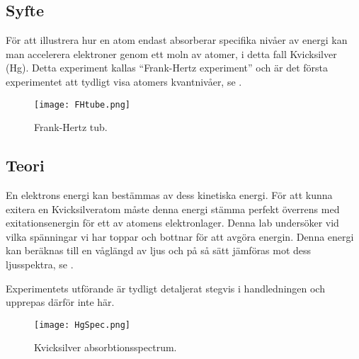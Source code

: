 \subsection*{Syfte}
För att illustrera hur en atom endast absorberar specifika nivåer av energi kan man accelerera elektroner genom ett moln av atomer, i detta fall Kvicksilver (Hg). 
Detta experiment kallas ``Frank-Hertz experiment'' och är det första experimentet att tydligt visa atomers kvantnivåer, se .
\begin{figure}[hb]
	\centering
	\texttt{[image: FHtube.png]}
	\caption{Frank-Hertz tub.\cite{handledning}}
	\label{fig:tubesch}
\end{figure}

\subsection*{Teori}
En elektrons energi kan bestämmas av dess kinetiska energi. För att kunna exitera en Kvicksilveratom måste denna energi stämma perfekt överrens med exitationsenergin för ett av atomens elektronlager.
Denna lab undersöker vid vilka spänningar vi har toppar och bottnar för att avgöra energin. Denna energi kan beräknas till en våglängd av ljus och på så sätt jämföras mot dess ljusspektra, se .%

Experimentets utförande är tydligt detaljerat stegvis i handledningen\cite{handledning} och upprepas därför inte här. 
\begin{figure}[hb]
	\centering
	\texttt{[image: HgSpec.png]}
	\caption{Kvicksilver absorbtionsspectrum.\cite{astronoo}}
	\label{fig:hgspec}
\end{figure}

